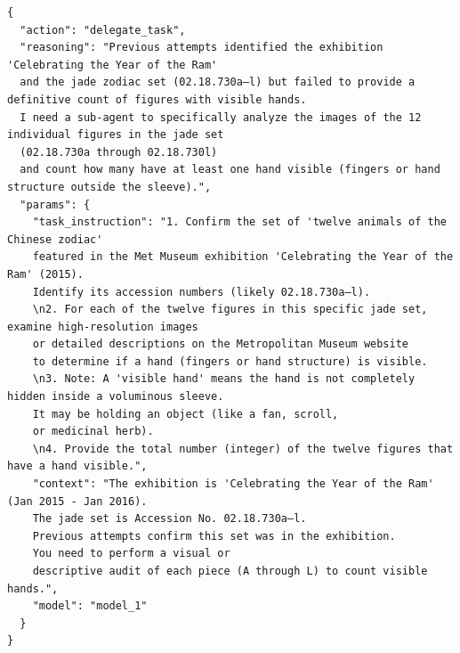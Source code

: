 \begin{tcolorbox}[
  title={\textbf{\small Attempt 4 - Main Decision}},
  boxrule=1pt,
  arc=0mm,
  colback=gray!5,
  colframe=gray!70,
  breakable,
  before skip=10pt,
  after skip=10pt,
  pad at break=2mm,
  parbox=false
]
\begin{verbatim}
{
  "action": "delegate_task",
  "reasoning": "Previous attempts identified the exhibition 'Celebrating the Year of the Ram' 
  and the jade zodiac set (02.18.730a–l) but failed to provide a definitive count of figures with visible hands. 
  I need a sub-agent to specifically analyze the images of the 12 individual figures in the jade set 
  (02.18.730a through 02.18.730l) 
  and count how many have at least one hand visible (fingers or hand structure outside the sleeve).",
  "params": {
    "task_instruction": "1. Confirm the set of 'twelve animals of the Chinese zodiac'
    featured in the Met Museum exhibition 'Celebrating the Year of the Ram' (2015). 
    Identify its accession numbers (likely 02.18.730a–l).
    \n2. For each of the twelve figures in this specific jade set, examine high-resolution images 
    or detailed descriptions on the Metropolitan Museum website 
    to determine if a hand (fingers or hand structure) is visible.
    \n3. Note: A 'visible hand' means the hand is not completely hidden inside a voluminous sleeve.
    It may be holding an object (like a fan, scroll,
    or medicinal herb).
    \n4. Provide the total number (integer) of the twelve figures that have a hand visible.",
    "context": "The exhibition is 'Celebrating the Year of the Ram' (Jan 2015 - Jan 2016). 
    The jade set is Accession No. 02.18.730a–l.
    Previous attempts confirm this set was in the exhibition.
    You need to perform a visual or 
    descriptive audit of each piece (A through L) to count visible hands.",
    "model": "model_1"
  }
}
\end{verbatim}
\end{tcolorbox}

